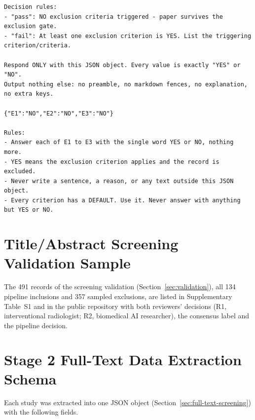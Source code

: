 \begin{lstlisting}
Decision rules:
- "pass": NO exclusion criteria triggered - paper survives the exclusion gate.
- "fail": At least one exclusion criterion is YES. List the triggering criterion/criteria.

Respond ONLY with this JSON object. Every value is exactly "YES" or "NO".
Output nothing else: no preamble, no markdown fences, no explanation, no extra keys.

{"E1":"NO","E2":"NO","E3":"NO"}

Rules:
- Answer each of E1 to E3 with the single word YES or NO, nothing more.
- YES means the exclusion criterion applies and the record is excluded.
- Never write a sentence, a reason, or any text outside this JSON object.
- Every criterion has a DEFAULT. Use it. Never answer with anything but YES or NO.
\end{lstlisting}

\section{Title/Abstract Screening Validation Sample}
\label{appendix:screening_validation}

The 491 records of the screening validation (Section~\ref{sec:validation}), all 134 pipeline inclusions and 357 sampled exclusions, are listed in Supplementary Table~S1 and in the public repository with both reviewers' decisions (R1, interventional radiologist; R2, biomedical AI researcher), the consensus label and the pipeline decision.

\section{Stage 2 Full-Text Data Extraction Schema}
\label{appendix:extraction_schema}

Each study was extracted into one JSON object (Section~\ref{sec:full-text-screening}) with the following fields.

